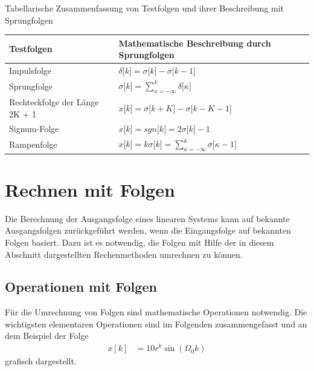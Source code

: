 \begin{summary}{Tabellarische Zusammenfassung von Testfolgen und ihrer Beschreibung mit Sprungfolgen}
\label{tab:3.3}
\begin{center}
  \begin{tabular}{ll}
    \toprule
    Testfolgen & 
Mathematische Beschreibung 
durch Sprungfolgen \\
    \midrule
    Impulsfolge & \(\delta\lbrack k\rbrack = \sigma\lbrack k\rbrack - \sigma\lbrack k - 1\rbrack\) \\
    Sprungfolge & \(\sigma\lbrack k\rbrack = \sum\limits_{\kappa = - \infty}^{k}{\delta\lbrack\kappa\rbrack}\) \\
    Rechteckfolge der Länge 2K + 1 & \(x\lbrack k\rbrack = \sigma\lbrack k + K\rbrack - \sigma\lbrack k - K - 1\rbrack\) \\
    Signum-Folge & \(x\lbrack k\rbrack = {sgn}\lbrack k\rbrack = 2  \sigma\lbrack k\rbrack - 1\) \\
    Rampenfolge & \(x\lbrack k\rbrack = k  \sigma\lbrack k\rbrack = \sum\limits_{\kappa = - \infty}^{k}{\sigma\lbrack\kappa - 1\rbrack}\) \\
    \bottomrule
  \end{tabular}
\end{center}
\end{summary}

\section{Rechnen mit Folgen}\label{sec:3.3}

Die Berechnung der Ausgangsfolge eines linearen Systems kann auf bekannte Ausgangsfolgen zurückgeführt werden, wenn die Eingangsfolge auf bekannten Folgen basiert. Dazu ist es notwendig, die Folgen mit Hilfe der in diesem Abschnitt dargestellten Rechenmethoden umrechnen zu können.

\subsection{Operationen mit Folgen}\label{sec:operationen-mit-folgen}

Für die Umrechnung von Folgen sind mathematische Operationen notwendig. Die wichtigsten elementaren Operationen sind im Folgenden zusammengefasst und an dem Beispiel der Folge
\begin{align}
x[ k] &= 10  r^{k}  \sin\left( \Omega_{0}  k \right) \label{eq:3.42}
\end{align}
grafisch dargestellt.

